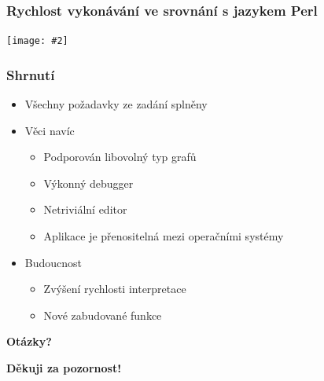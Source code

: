 \documentclass{beamer}
\newcommand{\frameWithTitleImage}[2]
{
	\begin{frame}
		\frametitle{#1}
		\begin{center}
		\texttt{[image: \#2]}
		\end{center}
	\end{frame}
}
\newcommand{\frameWithTitle}[1]
{
	\begin{frame}
		\begin{center}
		\textbf{\Large{#1}}
		\end{center}
	\end{frame}
}
\begin{document}
\frameWithTitleImage{Rychlost vykonávání ve srovnání s jazykem Perl}{../text/img/benchmark.pdf}


\begin{frame}
	\frametitle{Shrnutí}
	\begin{itemize}
	\item Všechny požadavky ze zadání splněny
	\item Věci navíc
		\begin{itemize}
		\item Podporován libovolný typ grafů
		\item Výkonný debugger
		\item Netriviální editor
		\item Aplikace je přenositelná mezi operačními systémy
		\end{itemize}
	\item Budoucnost
		\begin{itemize}
		\item Zvýšení rychlosti interpretace
		\item Nové zabudované funkce
		\end{itemize}
	\end{itemize}
\end{frame}


\frameWithTitle{Otázky?}
\frameWithTitle{Děkuji za pozornost!}
\end{document}
